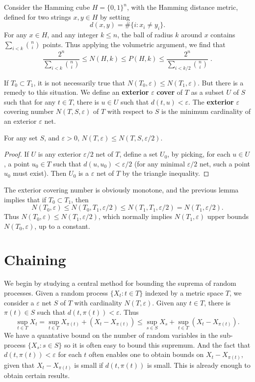 \begin{example}
	Consider the Hamming cube $H = \{ 0, 1 \}^n$, with the Hamming distance metric, defined for two strings $x,y \in H$ by setting
	\[ d(x,y) = \# \{ i: x_i \neq y_i \}. \]
	For any $x \in H$, and any integer $k \leq n$, the ball of radius $k$ around $x$ contains $\sum_{i < k} {n \choose i}$ points. Thus applying the volumetric argument, we find that
	\[ \frac{2^n}{\sum_{i < k} {n \choose i}} \leq N(H,k) \leq P(H,k) \leq \frac{2^n}{\sum_{i < k/2} {n \choose i}}\; . \]
\end{example}

If $T_0 \subset T_1$, it is not necessarily true that $N(T_0,\varepsilon) \leq N(T_1,\varepsilon)$. But there is a remedy to this situation. We define an \textbf{exterior} $\varepsilon$ \textbf{cover} of $T$ as a subset $U$ of $S$ such that for any $t \in T$, there is $u \in U$ such that $d(t,u) < \varepsilon$. The \textbf{exterior} $\varepsilon$ covering number $N(T,S,\varepsilon)$ of $T$ with respect to $S$ is the minimum cardinality of an exterior $\varepsilon$ net.

\begin{lemma}
	For any set $S$, and $\varepsilon > 0$, $N(T,\varepsilon) \leq N(T,S,\varepsilon/2)$.
\end{lemma}
\begin{proof}
	If $U$ is any exterior $\varepsilon/2$ net of $T$, define a set $U_0$, by picking, for each $u \in U$, a point $u_0 \in T$ such that $d(u,u_0) < \varepsilon/2$ (for any minimal $\varepsilon/2$ net, such a point $u_0$ must exist). Then $U_0$ is a $\varepsilon$ net of $T$ by the triangle inequality.
\end{proof}

The exterior covering number is obviously monotone, and the previous lemma implies that if $T_0 \subset T_1$, then
%
\[ N(T_0,\varepsilon) \leq N(T_0,T_1,\varepsilon/2) \leq N(T_1,T_1,\varepsilon/2) = N(T_1,\varepsilon/2). \]
%
Thus $N(T_0,\varepsilon) \leq N(T_1,\varepsilon/2)$, which normally implies $N(T_1,\varepsilon)$ upper bounds $N(T_0,\varepsilon)$, up to a constant.

\section{Chaining}

We begin by studying a central method for bounding the suprema of random processes. Given a random process $\{ X_t : t \in T \}$ indexed by a metric space $T$, we consider a $\varepsilon$ net $S$ of $T$ with cardinality $N(T,\varepsilon)$. Given any $t \in T$, there is $\pi(t) \in S$ such that $d(t,\pi(t)) < \varepsilon$. Thus 
%
\[ \sup_{t \in T} X_t = \sup_{t \in T} X_{\pi(t)} + (X_t - X_{\pi(t)}) \leq \sup_{s \in S} X_s + \sup_{t \in T} (X_t - X_{\pi(t)}). \]
%
We have a quantative bound on the number of random variables in the sub-process $\{ X_s : s \in S \}$ so it is often easy to bound this supremum. And the fact that $d(t,\pi(t)) < \varepsilon$ for each $t$ often enables one to obtain bounds on $X_t - X_{\pi(t)}$, given that $X_t - X_{\pi(t)}$ is small if $d(t,\pi(t))$ is small. This is already enough to obtain certain results.

